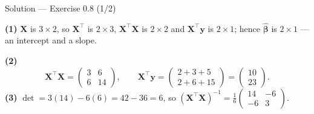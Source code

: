 \documentclass[aspectratio=169,11pt]{beamer}
\begin{document}
\begin{frame}{Solution --- Exercise 0.8 (1/2)}
  \begin{solutionbox}
    \textbf{(1)} $\mathbf{X}$ is $3\times2$, so $\mathbf{X}^\top$ is
    $2\times3$, $\mathbf{X}^\top\mathbf{X}$ is $2\times2$ and
    $\mathbf{X}^\top\mathbf{y}$ is $2\times1$; hence
    $\hat{\boldsymbol\beta}$ is $2\times1$ --- an intercept and a slope.

    \textbf{(2)}
    \[
      \mathbf{X}^\top\mathbf{X}
      = \begin{pmatrix} 3 & 6 \\ 6 & 14 \end{pmatrix},
      \qquad
      \mathbf{X}^\top\mathbf{y}
      = \begin{pmatrix} 2+3+5 \\ 2+6+15 \end{pmatrix}
      = \begin{pmatrix} 10 \\ 23 \end{pmatrix}.
    \]
    \textbf{(3)} $\det = 3(14) - 6(6) = 42 - 36 = 6$, so
    $(\mathbf{X}^\top\mathbf{X})^{-1}
      = \frac{1}{6}\begin{pmatrix} 14 & -6 \\ -6 & 3\end{pmatrix}$.
  \end{solutionbox}
\end{frame}
\end{document}
